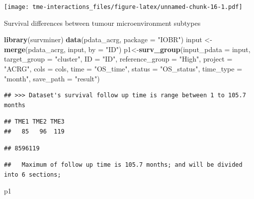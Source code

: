 \documentclass[
  12pt,
]{book}
\newenvironment{Shaded}{\begin{snugshade}}{\end{snugshade}}
\newcommand{\AttributeTok}[1]{\textcolor[rgb]{0.13,0.29,0.53}{#1}}
\newcommand{\FunctionTok}[1]{\textcolor[rgb]{0.13,0.29,0.53}{\textbf{#1}}}
\newcommand{\NormalTok}[1]{#1}
\newcommand{\OtherTok}[1]{\textcolor[rgb]{0.56,0.35,0.01}{#1}}
\newcommand{\StringTok}[1]{\textcolor[rgb]{0.31,0.60,0.02}{#1}}
\begin{document}
\texttt{[image: tme-interactions\_files/figure-latex/unnamed-chunk-16-1.pdf]}

Survival differences between tumour microenvironment subtypes

\begin{Shaded}
\begin{Highlighting}[]
\FunctionTok{library}\NormalTok{(survminer)}
\FunctionTok{data}\NormalTok{(pdata\_acrg, }\AttributeTok{package =} \StringTok{"IOBR"}\NormalTok{)}
\NormalTok{input }\OtherTok{\textless{}{-}} \FunctionTok{merge}\NormalTok{(pdata\_acrg, input, }\AttributeTok{by =} \StringTok{"ID"}\NormalTok{)}
\NormalTok{p1}\OtherTok{\textless{}{-}}\FunctionTok{surv\_group}\NormalTok{(}\AttributeTok{input\_pdata       =}\NormalTok{ input,}
               \AttributeTok{target\_group      =} \StringTok{"cluster"}\NormalTok{,}
               \AttributeTok{ID                =} \StringTok{"ID"}\NormalTok{,}
               \AttributeTok{reference\_group   =} \StringTok{"High"}\NormalTok{,}
               \AttributeTok{project           =} \StringTok{"ACRG"}\NormalTok{,}
               \AttributeTok{cols              =}\NormalTok{ cols, }
               \AttributeTok{time              =} \StringTok{"OS\_time"}\NormalTok{,}
               \AttributeTok{status            =} \StringTok{"OS\_status"}\NormalTok{,}
               \AttributeTok{time\_type         =} \StringTok{"month"}\NormalTok{,}
               \AttributeTok{save\_path         =} \StringTok{"result"}\NormalTok{)}
\end{Highlighting}
\end{Shaded}

\begin{verbatim}
## >>> Dataset's survival follow up time is range between 1 to 105.7 months
\end{verbatim}

\begin{verbatim}
## TME1 TME2 TME3 
##   85   96  119
\end{verbatim}

\begin{verbatim}
## 8596119
\end{verbatim}

\begin{verbatim}
##   Maximum of follow up time is 105.7 months; and will be divided into 6 sections;
\end{verbatim}

\begin{Shaded}
\begin{Highlighting}[]
\NormalTok{p1}
\end{Highlighting}
\end{Shaded}
\end{document}
